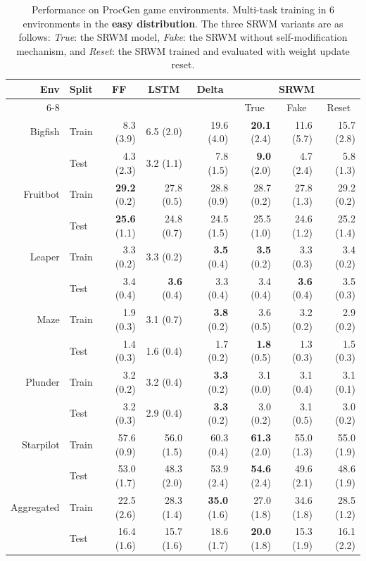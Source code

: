 \documentclass[nohyperref]{article}
\theoremstyle{plain}
\theoremstyle{definition}
\theoremstyle{remark}
\begin{document}
\begin{table}[h]
\caption{Performance on ProcGen game environments. Multi-task training in 6 environments in the \textbf{easy distribution}.
The three SRWM variants are as follows:
\textit{True}: the SRWM model, \textit{Fake}: the SRWM without
self-modification mechanism, and \textit{Reset}: the SRWM trained
and evaluated with weight update reset.
}
\label{app:tab:multi6}
\begin{center}
\begin{tabular}{rlrrrrrr}
\toprule
\multirow{2}{*}{Env} & \multirow{2}{*}{Split} & \multicolumn{1}{c}{\multirow{2}{*}{FF}}  & \multicolumn{1}{c}{\multirow{2}{*}{LSTM}} & \multicolumn{1}{c}{\multirow{2}{*}{Delta}} & \multicolumn{3}{c}{SRWM} \\ \cmidrule(r){6-8} 
 &  &   &  &  & \multicolumn{1}{c}{True} & \multicolumn{1}{c}{Fake} & \multicolumn{1}{c}{Reset} \\ \midrule
Bigfish   & Train & 8.3 (3.9) & 6.5 (2.0) & 19.6 (4.0) & \textbf{20.1} (2.4) & 11.6 (5.7) & 15.7 (2.8) \\
          & Test  &  4.3 (2.3) & 3.2 (1.1) & 7.8 (1.5) & \textbf{9.0} (2.0) & 4.7 (2.4)  & 5.8 (1.3) \\ \midrule
Fruitbot  & Train & \textbf{29.2} (0.2) & 27.8 (0.5) & 28.8 (0.9) & 28.7 (0.2) & 27.8 (1.3) & 29.2 (0.2) \\
          & Test  & \textbf{25.6} (1.1) & 24.8 (0.7) & 24.5 (1.5) & 25.5 (1.0) & 24.6 (1.2) & 25.2 (1.4) \\ \midrule
Leaper    & Train & 3.3 (0.2) & 3.3 (0.2) & \textbf{3.5} (0.4) & \textbf{3.5} (0.2) & 3.3 (0.3) & 3.4 (0.2) \\
          & Test  & 3.4 (0.4) &  \textbf{3.6} (0.4) &  3.3 (0.4) & 3.4 (0.4) & \textbf{3.6} (0.4) & 3.5 (0.3) \\ \midrule
Maze  & Train & 1.9 (0.3) & 3.1 (0.7) &  \textbf{3.8} (0.2) & 3.6 (0.5) & 3.2 (0.2) & 2.9 (0.2) \\
      & Test  & 1.4 (0.3) & 1.6 (0.4) & 1.7 (0.2) &  \textbf{1.8} (0.5) & 1.3 (0.3) & 1.5 (0.3) \\ \midrule
Plunder   & Train & 3.2 (0.2) & 3.2 (0.4) &  \textbf{3.3} (0.2) & 3.1 (0.0) & 3.1 (0.4) & 3.1 (0.1) \\
          & Test  & 3.2 (0.3)  & 2.9 (0.4) &  \textbf{3.3} (0.2) & 3.0 (0.2) & 3.1 (0.5) & 3.0 (0.2) \\ \midrule
Starpilot & Train & 57.6 (0.9) & 56.0 (1.5) & 60.3 (0.4) &  \textbf{61.3} (2.0) & 55.0 (1.3) & 55.0 (1.9) \\
          & Test  & 53.0 (1.7) & 48.3 (2.0) & 53.9 (2.4) &  \textbf{54.6} (2.4) & 49.6 (2.1) & 48.6 (1.9) \\  \midrule \midrule
Aggregated & Train & 22.5 (2.6) & 28.3 (1.4) & \textbf{35.0} (1.6) & 27.0 (1.8) & 34.6 (1.8) & 28.5 (1.2) \\
& Test & 16.4 (1.6) & 15.7 (1.6) & 18.6 (1.7) & \textbf{20.0} (1.8) & 15.3 (1.9) & 16.1 (2.2) \\
\bottomrule
\end{tabular}
\end{center}
\end{table}
\end{document}
